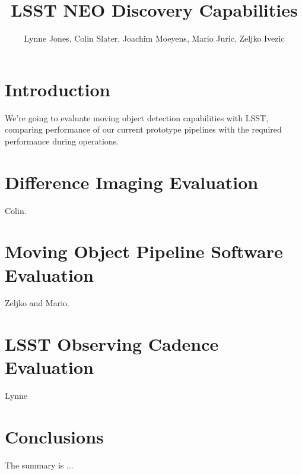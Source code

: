 \documentclass[12pt,preprint]{aastex}
\begin{document}
\title{LSST NEO Discovery Capabilities}

\author{Lynne Jones,  Colin Slater, Joachim Moeyens, Mario Juric, Zeljko Ivezic} %
\affil{}

\begin{abstract}

\end{abstract}

\keywords{}

\section{Introduction}

We're going to evaluate moving object detection capabilities with LSST, comparing performance of our current prototype pipelines with the required performance during operations.


\section{Difference Imaging Evaluation}

Colin.

\section{Moving Object Pipeline Software Evaluation}

Zeljko and Mario.


\section{LSST Observing Cadence Evaluation}

Lynne

\section{Conclusions}

The summary is ...



\end{document}
